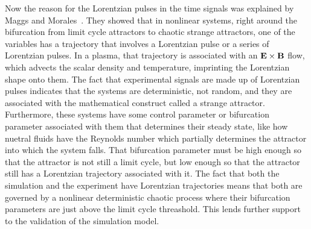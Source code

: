 Now the reason for the Lorentzian pulses in the time signals was explained by Maggs and Morales~\cite{maggs2012a}. They showed that in nonlinear systems, 
right around the bifurcation from limit cycle attractors to chaotic strange attractors, one of the variables has a trajectory that involves a Lorentzian pulse or a series of Lorentzian pulses.
In a plasma, that trajectory is associated with an ${\bf E \times B}$ flow, which advects the scalar density and temperature, imprinting the Lorentzian shape onto them.
The fact that experimental signals are made up of Lorentzian pulses indicates that the systems are deterministic, not random, and they are associated with the mathematical construct called
a strange attractor. Furthermore, these systems have some control parameter or bifurcation parameter associated with them that determines their steady state, 
like how nuetral fluids have the Reynolds number which partially determines the attractor into which the system falls. That bifurcation parameter must be high enough so that the attractor is not
still a limit cycle, but low enough so that the attractor still has a Lorentzian trajectory associated with it.
The fact that both the simulation and the experiment have Lorentzian trajectories means that both are governed by a nonlinear deterministic chaotic process where their bifurcation parameters
are just above the limit cycle threashold. This lends further support to the validation of the simulation model.
